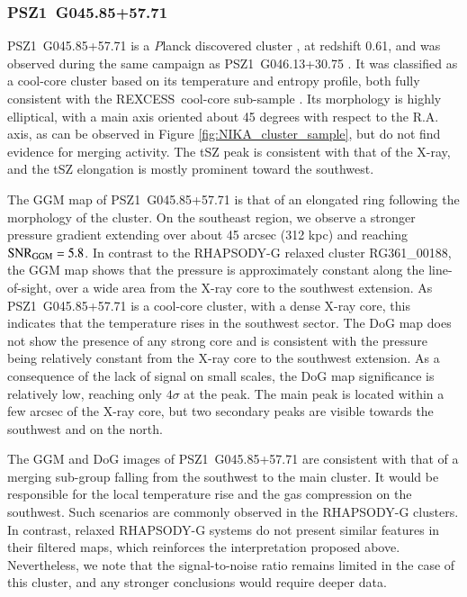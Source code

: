 \documentclass[twocolumn,traditabstract]{aa}
\newcommand{\rexcess}{{\gwpfont REXCESS}}
\begin{document}
\subsubsection{PSZ1~G045.85+57.71}
\mbox{PSZ1~G045.85+57.71} is a {\textit Planck} discovered cluster \citep{PlanckXXIX2014}, at redshift 0.61, and was observed during the same campaign as \mbox{PSZ1~G046.13+30.75} \citep[see][for more details]{Ruppin2016}. It was classified as a cool-core cluster based on its temperature and entropy profile, both fully consistent with the \rexcess\ cool-core sub-sample \citep{Bohringer2007,Arnaud2010,Pratt2010}. Its morphology is highly elliptical, with a main axis oriented about 45 degrees with respect to the R.A. axis, as can be observed in Figure \ref{fig:NIKA_cluster_sample}, but \cite{Ruppin2016} do not find evidence for merging activity. The tSZ peak is consistent with that of the X-ray, and the tSZ elongation is mostly prominent toward the southwest.

The GGM map of \mbox{PSZ1~G045.85+57.71} is that of an elongated ring following the morphology of the cluster. On the southeast region, we observe a stronger pressure gradient extending over about 45 arcsec (312 kpc) and reaching ${\rm SNR}_{\rm GGM} = 5.8$. In contrast to the RHAPSODY-G relaxed cluster RG361\_00188, the GGM map shows that the pressure is approximately constant along the line-of-sight, over a wide area from the X-ray core to the southwest extension. As \mbox{PSZ1~G045.85+57.71} is a cool-core cluster, with a dense X-ray core, this indicates that the temperature rises in the southwest sector. The DoG map does not show the presence of any strong core and is consistent with the pressure being relatively constant from the X-ray core to the southwest extension. As a consequence of the lack of signal on small scales, the DoG map significance is relatively low, reaching only $4 \sigma$ at the peak. The main peak is located within a few arcsec of the X-ray core, but two secondary peaks are visible towards the southwest and on the north.

The GGM and DoG images of \mbox{PSZ1~G045.85+57.71} are consistent with that of a merging sub-group falling from the southwest to the main cluster. It would be responsible for the local temperature rise and the gas compression on the southwest. Such scenarios are commonly observed in the RHAPSODY-G clusters. In contrast, relaxed RHAPSODY-G systems do not present similar features in their filtered maps, which reinforces the interpretation proposed above. Nevertheless, we note that the signal-to-noise ratio remains limited in the case of this cluster, and any stronger conclusions would require deeper data.
\end{document}
